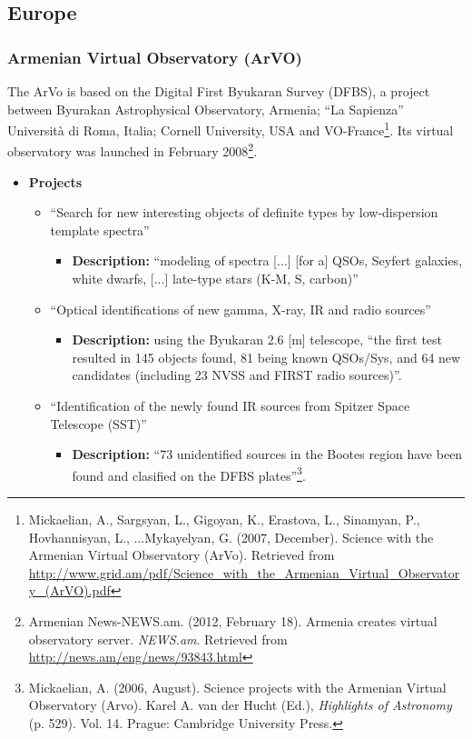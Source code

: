 \subsection{Europe}
\subsubsection{Armenian Virtual Observatory (ArVO)}
The ArVo \cite{website:arvo-home} is based on the Digital First Byukaran Survey
(DFBS), a project between Byurakan Astrophysical Observatory, Armenia; ``La
Sapienza'' Universit\`{a} di Roma, Italia; Cornell University, USA and
VO-France\footnote{Mickaelian, A., Sargsyan, L., Gigoyan, K., Erastova, L.,
Sinamyan, P., Hovhannisyan, L., ...Mykayelyan, G. (2007, December). Science with
the Armenian Virtual Observatory (ArVo).  Retrieved from
\url{http://www.grid.am/pdf/Science_with_the_Armenian_Virtual_Observatory_(ArVO).pdf}}.
Its virtual observatory was launched in February 2008\footnote{Armenian
News-NEWS.am. (2012, February 18). Armenia creates virtual observatory server.
\textit{NEWS.am}. Retrieved from \url{http://news.am/eng/news/93843.html}}.

\begin{itemize}
\item \textbf{Projects}
\begin{itemize}
\item ``Search for new interesting objects of definite types by low-dispersion
template spectra'' 
\begin{itemize}
\item \textbf{Description:} ``modeling of spectra [...] [for a] QSOs, Seyfert
galaxies, white dwarfs, [...] late-type stars (K-M, S, carbon)'' 
\end{itemize}
\end{itemize}
\begin{itemize}
\item ``Optical identifications of new gamma, X-ray, IR and radio sources''
\begin{itemize}
\item \textbf{Description:} using the Byukaran 2.6 [m] telescope, ``the first
test resulted in 145 objects found, 81 being known QSOs/Sys, and 64 new
candidates (including 23 NVSS and FIRST radio sources)''.
\end{itemize}
\end{itemize}
\begin{itemize}
\item ``Identification of the newly found IR sources from Spitzer Space
Telescope (SST)''
\begin{itemize}
\item \textbf{Description:} ``73 unidentified sources in the Bootes region have
been found and clasified on the DFBS plates''\footnote{Mickaelian, A. (2006,
August). Science projects with the Armenian Virtual Observatory (Arvo). Karel A.
van der Hucht (Ed.), \textit{Highlights of Astronomy} (p. 529). Vol. 14. Prague:
Cambridge University
Press. }.
\end{itemize}
\end{itemize}
\end{itemize}


